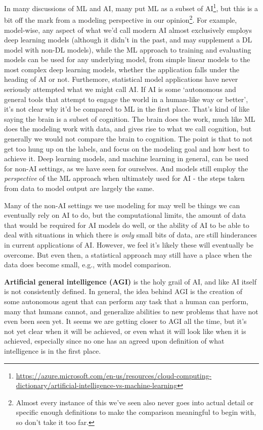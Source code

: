 \documentclass[
  letterpaper,
]{krantz}
\DeclareRobustCommand{\href}[2]{#2\footnote{\url{#1}}}
\begin{document}
In many discussions of ML and AI,
\href{https://azure.microsoft.com/en-us/resources/cloud-computing-dictionary/artificial-intelligence-vs-machine-learning}{many
put ML as a subset of AI}, but this is a bit off the mark from a
modeling perspective in our opinion\footnote{Almost every instance of
  this we've seen also never goes into actual detail or specific enough
  definitions to make the comparison meaningful to begin with, so don't
  take it too far.}. For example, model-wise, any aspect of what we'd
call modern AI almost exclusively employs deep learning models (although
it didn't in the past, and may supplement a DL model with non-DL
models), while the ML approach to training and evaluating models can be
used for any underlying model, from simple linear models to the most
complex deep learning models, whether the application falls under the
heading of AI or not. Furthemore, statistical model applications have
never seriously attempted what we might call AI. If AI is some
`autonomous and general tools that attempt to engage the world in a
human-like way or better', it's not clear why it'd be compared to ML in
the first place. That's kind of like saying the brain is a subset of
cognition. The brain does the work, much like ML does the modeling work
with data, and gives rise to what we call cognition, but generally we
would not compare the brain to cognition. The point is that to not get
too hung up on the labels, and focus on the modeling goal and how best
to achieve it. Deep learning models, and machine learning in general,
can be used for non-AI settings, as we have seen for ourselves. And
models still employ the \emph{perspective} of the ML approach when
ultimately used for AI - the steps taken from data to model output are
largely the same.

Many of the non-AI settings we use modeling for may well be things we
can eventually rely on AI to do, but the computational limits, the
amount of data that would be required for AI models do well, or the
ability of AI to be able to deal with situations in which there is
\emph{only} small bits of data, are still hinderances in current
applications of AI. However, we feel it's likely these will eventually
be overcome. But even then, a statistical approach may still have a
place when the data does become small, e.g., with model comparison.

\textbf{Artificial general intelligence (AGI)} is the holy grail of AI,
and like AI itself is not consistently defined. In general, the idea
behind AGI is the creation of some autonomous agent that can perform any
task that a human can perform, many that humans cannot, and generalize
abilities to new problems that have not even been seen yet. It seems we
are getting closer to AGI all the time, but it's not yet clear when it
will be achieved, or even what it will look like when it is achieved,
especially since no one has an agreed upon definition of what
intelligence is in the first place.
\end{document}
